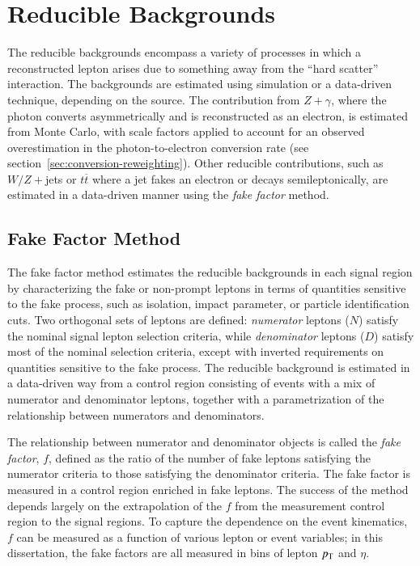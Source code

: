 \section{Reducible Backgrounds}\label{sec:reducible-backgrounds}
The reducible backgrounds encompass a variety of processes in which a reconstructed lepton arises due to something away from the ``hard scatter'' interaction. The backgrounds are estimated using simulation or a data-driven technique, depending on the source. The contribution from $Z+\gamma$, where the photon converts asymmetrically and is reconstructed as an electron, is estimated from Monte Carlo, with scale factors applied to account for an observed overestimation in the photon-to-electron conversion rate (see section~\ref{sec:conversion-reweighting}). Other reducible contributions, such as $W/Z+$jets or $t\overline{t}$ where a jet fakes an electron or decays semileptonically, are estimated in a data-driven manner using the \emph{fake factor} method. 


\subsection{Fake Factor Method}\label{sec:fake-factor-method}
The fake factor method estimates the reducible backgrounds in each signal region by characterizing the fake or non-prompt leptons in terms of quantities sensitive to the fake process, such as isolation, impact parameter, or particle identification cuts. Two orthogonal sets of leptons are defined: \emph{numerator} leptons ($N$) satisfy the nominal signal lepton selection criteria, while \emph{denominator} leptons ($D$) satisfy most of the nominal selection criteria, except with inverted requirements on quantities sensitive to the fake process. The reducible background is estimated in a data-driven way from a control region consisting of events with a mix of numerator and denominator leptons, together with a parametrization of the relationship between numerators and denominators. 

The relationship between numerator and denominator objects is called the \emph{fake factor}, $f$, defined as the ratio of the number of fake leptons satisfying the numerator criteria to those satisfying the denominator criteria. The fake factor is measured in a control region enriched in fake leptons. The success of the method depends largely on the extrapolation of the $f$ from the measurement control region to the signal regions. To capture the dependence on the event kinematics, $f$ can be measured as a function of various lepton or event variables; in this dissertation, the fake factors are all measured in bins of lepton $p_{\text{T}}$ and $\eta$. 

